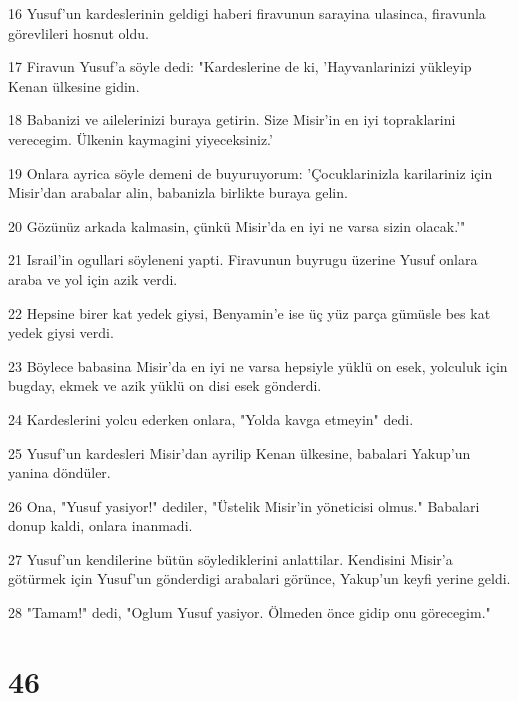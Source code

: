 \par 16 Yusuf'un kardeslerinin geldigi haberi firavunun sarayina ulasinca, firavunla görevlileri hosnut oldu.
\par 17 Firavun Yusuf'a söyle dedi: "Kardeslerine de ki, 'Hayvanlarinizi yükleyip Kenan ülkesine gidin.
\par 18 Babanizi ve ailelerinizi buraya getirin. Size Misir'in en iyi topraklarini verecegim. Ülkenin kaymagini yiyeceksiniz.'
\par 19 Onlara ayrica söyle demeni de buyuruyorum: 'Çocuklarinizla karilariniz için Misir'dan arabalar alin, babanizla birlikte buraya gelin.
\par 20 Gözünüz arkada kalmasin, çünkü Misir'da en iyi ne varsa sizin olacak.'"
\par 21 Israil'in ogullari söyleneni yapti. Firavunun buyrugu üzerine Yusuf onlara araba ve yol için azik verdi.
\par 22 Hepsine birer kat yedek giysi, Benyamin'e ise üç yüz parça gümüsle bes kat yedek giysi verdi.
\par 23 Böylece babasina Misir'da en iyi ne varsa hepsiyle yüklü on esek, yolculuk için bugday, ekmek ve azik yüklü on disi esek gönderdi.
\par 24 Kardeslerini yolcu ederken onlara, "Yolda kavga etmeyin" dedi.
\par 25 Yusuf'un kardesleri Misir'dan ayrilip Kenan ülkesine, babalari Yakup'un yanina döndüler.
\par 26 Ona, "Yusuf yasiyor!" dediler, "Üstelik Misir'in yöneticisi olmus." Babalari donup kaldi, onlara inanmadi.
\par 27 Yusuf'un kendilerine bütün söylediklerini anlattilar. Kendisini Misir'a götürmek için Yusuf'un gönderdigi arabalari görünce, Yakup'un keyfi yerine geldi.
\par 28 "Tamam!" dedi, "Oglum Yusuf yasiyor. Ölmeden önce gidip onu görecegim."

\chapter{46}

